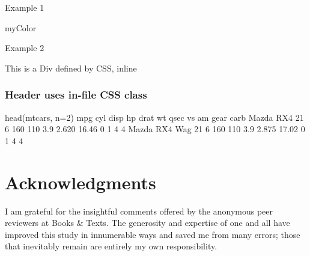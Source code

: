 \documentclass[
]{report}
\newenvironment{Shaded}{\begin{snugshade}}{\end{snugshade}}
\newcommand{\AttributeTok}[1]{\textcolor[rgb]{0.40,0.45,0.13}{#1}}
\newcommand{\DecValTok}[1]{\textcolor[rgb]{0.68,0.00,0.00}{#1}}
\newcommand{\FloatTok}[1]{\textcolor[rgb]{0.68,0.00,0.00}{#1}}
\newcommand{\FunctionTok}[1]{\textcolor[rgb]{0.28,0.35,0.67}{#1}}
\newcommand{\NormalTok}[1]{\textcolor[rgb]{0.00,0.23,0.31}{#1}}
\begin{document}
Example 1

myColor

Example 2

This is a Div defined by CSS, inline

\subsubsection{Header uses in-file CSS
class}\label{header-uses-in-file-css-class}

\begin{Shaded}
\begin{Highlighting}[]
\FunctionTok{head}\NormalTok{(mtcars, }\AttributeTok{n=}\DecValTok{2}\NormalTok{)}
\NormalTok{              mpg cyl disp  hp drat    wt  qsec vs am gear carb}
\NormalTok{Mazda RX4      }\DecValTok{21}   \DecValTok{6}  \DecValTok{160} \DecValTok{110}  \FloatTok{3.9} \FloatTok{2.620} \FloatTok{16.46}  \DecValTok{0}  \DecValTok{1}    \DecValTok{4}    \DecValTok{4}
\NormalTok{Mazda RX4 Wag  }\DecValTok{21}   \DecValTok{6}  \DecValTok{160} \DecValTok{110}  \FloatTok{3.9} \FloatTok{2.875} \FloatTok{17.02}  \DecValTok{0}  \DecValTok{1}    \DecValTok{4}    \DecValTok{4}
\end{Highlighting}
\end{Shaded}

\section{Acknowledgments}\label{acknowledgments}

I am grateful for the insightful comments offered by the anonymous peer
reviewers at Books \& Texts. The generosity and expertise of one and all
have improved this study in innumerable ways and saved me from many
errors; those that inevitably remain are entirely my own responsibility.
\end{document}
